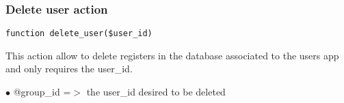 \documentclass[a4paper]{article}
\begin{document}
\hypertarget{toc184}{}
\subsubsection{Delete user action}

\begin{lstlisting}
function delete_user($user_id)
\end{lstlisting}

This action allow to delete registers in the database associated to
the users app and only requires the user\_id.

\begin{compactitem}
\item[\color{myblue}$\bullet$] @group\_id =$>$ the user\_id desired to be deleted
\end{compactitem}

\end{document}
